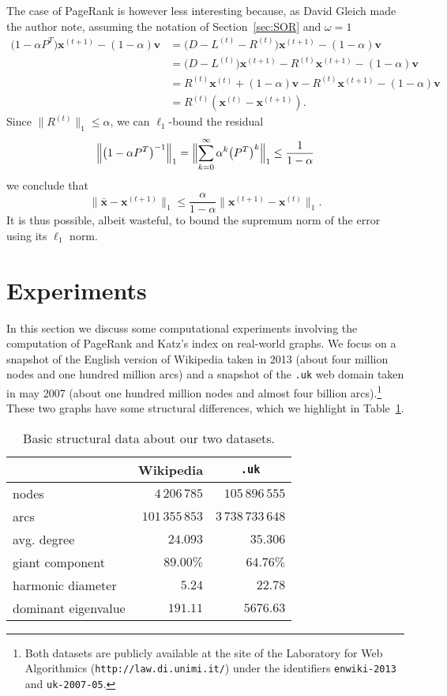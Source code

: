 \documentclass{article}
\newcommand{\1}{\mathbf 1}
\begin{document}
The case of PageRank is however less interesting because, as David Gleich made
the author note, assuming the notation of Section~\ref{sec:SOR} and $\omega=1$
\begin{align*}
 \bigl(1-\alpha P^T\bigr)\bm x^{(t+1)} -(1-\alpha)\bm v &= \bigl(D- L^{(t)}-
 R^{(t)}\bigr)\bm x^{(t+1)}  -(1-\alpha)\bm v\\
&=  \bigl(D- L^{(t)}\bigr)\bm x^{(t+1)} - R^{(t)}\bm x^{(t+1)}  -(1-\alpha)\bm
 v\\
&=  R^{(t)}\bm x^{(t)}+ (1-\alpha)\bm
 v - R^{(t)}\bm x^{(t+1)}  -(1-\alpha)\bm
 v\\
 &= R^{(t)}(\bm x^{(t)}-\bm x^{(t+1)}).
\end{align*}
Since $\bigl\|R^{(t)}\bigr\|_1\leq \alpha$, we can $\ell_1$-bound the residual
\[
\Bigl\|\bigl(1-\alpha P^T\bigr)^{-1}\Bigr\|_1 =
\Bigl\|\sum_{k=0}^\infty\alpha^k\bigl(P^T\bigr)^k\Bigr\|_1\leq
\frac1{1-\alpha}
\]
we conclude that
\[
\bigl\|\bar{\bm x} -\bm x^{(t+1)}\bigr\|_1\leq\frac\alpha{1-\alpha}\bigl\|\bm
x^{(t+1)}-\bm x^{(t)}\bigr\|_1.
\]
It is thus possible, albeit wasteful, to bound the supremum norm of the error
using its $\ell_1$ norm.

\section{Experiments}

In this section we discuss some computational experiments involving the computation of PageRank
and Katz's index on real-world graphs. We focus on a snapshot of the English version of Wikipedia taken in 2013
(about four million nodes and one hundred million arcs) and a snapshot of the \texttt{.uk} web domain
taken in may 2007 (about one hundred million nodes and almost four billion arcs).\footnote{Both datasets are
publicly available at the site of the Laboratory for Web Algorithmics (\texttt{http://law.di.unimi.it/}) under the identifiers
\texttt{enwiki-2013} and \texttt{uk-2007-05}.} These two graphs have some structural differences, which we highlight
in Table~\ref{tab:datasets}.

\begin{table}
\centering
\begin{tabular}{l|rr}
& \multicolumn{1}{c}{Wikipedia} & \multicolumn{1}{c}{\texttt{.uk}}\\
\hline
nodes & $4\,206\,785$ & $105\,896\,555$ \\
arcs & $101\,355\,853$ & $3\,738\,733\,648$\\
avg. degree & $24.093$ & $35.306$\\
giant component & $89.00\%$ & $64.76\%$ \\
harmonic diameter & $5.24$ & $22.78$\\
dominant eigenvalue & $191.11$ & $5676.63$ \\  
\end{tabular}
\caption{\label{tab:datasets}Basic structural data about our two datasets.}
\end{table}
\end{document}
